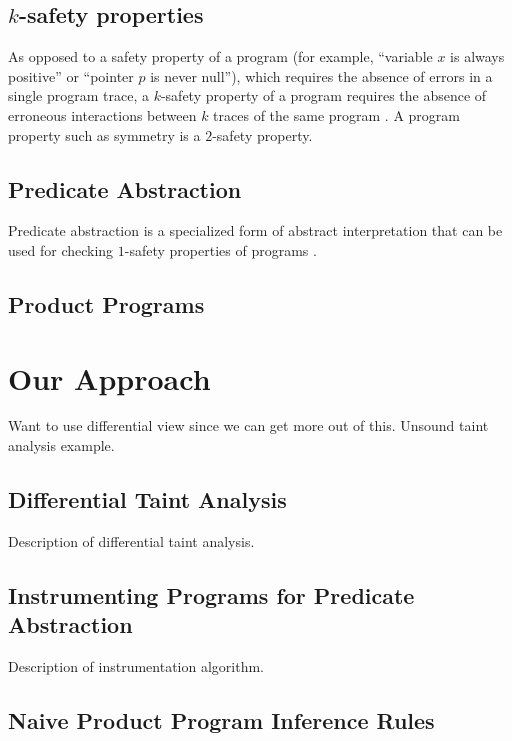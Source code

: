 \documentclass[letterpaper,twocolumn,10pt]{article}
\begin{document}
\subsection{$k$-safety properties}

As opposed to a safety property of a program (for example, ``variable $x$ is always positive'' or ``pointer $p$ is never null''), which requires
the absence of errors in a single program trace, a $k$-safety property of a program requires the absence of erroneous interactions between $k$
traces of the same program \cite{sousa2016cartesian}. A program property such as symmetry is a $2$-safety property.


\subsection{Predicate Abstraction}

Predicate abstraction is a specialized form of abstract interpretation that can be used for checking $1$-safety properties of programs
\cite{flanagan2002predicate}.


\subsection{Product Programs}

\section{Our Approach}

Want to use differential view since we can get more out of this. Unsound taint analysis example.

\subsection{Differential Taint Analysis}

Description of differential taint analysis.

\subsection{Instrumenting Programs for Predicate Abstraction}

Description of instrumentation algorithm.

\subsection{Naive Product Program Inference Rules}
\end{document}
